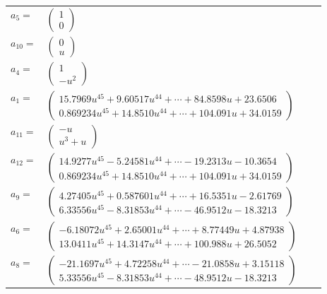 \documentclass[1p]{elsarticle_modified}
\theoremstyle{definition}
\begin{document}
\begin{tabular}{m{7pt} m{180pt} m{7pt} m{180pt} }
\flushright $a_{5}=$&$\begin{pmatrix}1\\0\end{pmatrix}$ \\
\flushright $a_{10}=$&$\begin{pmatrix}0\\u\end{pmatrix}$ \\
\flushright $a_{4}=$&$\begin{pmatrix}1\\- u^2\end{pmatrix}$ \\
\flushright $a_{1}=$&$\begin{pmatrix}15.7969 u^{45}+9.60517 u^{44}+\cdots+84.8598 u+23.6506\\0.869234 u^{45}+14.8510 u^{44}+\cdots+104.091 u+34.0159\end{pmatrix}$ \\
\flushright $a_{11}=$&$\begin{pmatrix}- u\\u^3+u\end{pmatrix}$ \\
\flushright $a_{12}=$&$\begin{pmatrix}14.9277 u^{45}-5.24581 u^{44}+\cdots-19.2313 u-10.3654\\0.869234 u^{45}+14.8510 u^{44}+\cdots+104.091 u+34.0159\end{pmatrix}$ \\
\flushright $a_{9}=$&$\begin{pmatrix}4.27405 u^{45}+0.587601 u^{44}+\cdots+16.5351 u-2.61769\\6.33556 u^{45}-8.31853 u^{44}+\cdots-46.9512 u-18.3213\end{pmatrix}$ \\
\flushright $a_{6}=$&$\begin{pmatrix}-6.18072 u^{45}+2.65001 u^{44}+\cdots+8.77449 u+4.87938\\13.0411 u^{45}+14.3147 u^{44}+\cdots+100.988 u+26.5052\end{pmatrix}$ \\
\flushright $a_{8}=$&$\begin{pmatrix}-21.1697 u^{45}+4.72258 u^{44}+\cdots-21.0858 u+3.15118\\5.33556 u^{45}-8.31853 u^{44}+\cdots-48.9512 u-18.3213\end{pmatrix}$ \\

\end{tabular}
\end{document}
